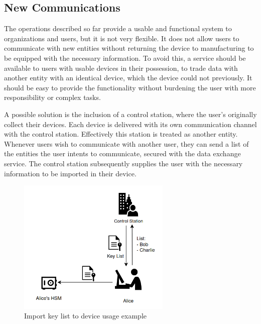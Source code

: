 
\subsection{New Communications}\label{chap:problem:scenarios:keys}

The operations described so far provide a usable and functional system to organizations and users, but it is not very flexible. It does not allow users to communicate with new entities without returning the device to manufacturing to be equipped with the necessary information.
To avoid this, a service should be available to users with usable devices in their possession, to trade data with another entity with an identical device, which the device could not previously. It should be easy to provide the functionality without burdening the user with more responsibility or complex tasks.

A possible solution is the inclusion of a control station, where the user's originally collect their devices. Each device is delivered with its own communication channel with the control station. Effectively this station is treated as another entity.
Whenever users wish to communicate with another user, they can send a list of the entities the user intents to communicate, secured with the data exchange service. The control station subsequently supplies the user with the necessary information to be imported in their device.

\begin{figure}[h]
    \centering
    \includegraphics[width=0.65\textwidth]{./Images/user-import-service.png}
    \caption{Import key list to device usage example}
    \label{fig:user:import-service}
\end{figure}

